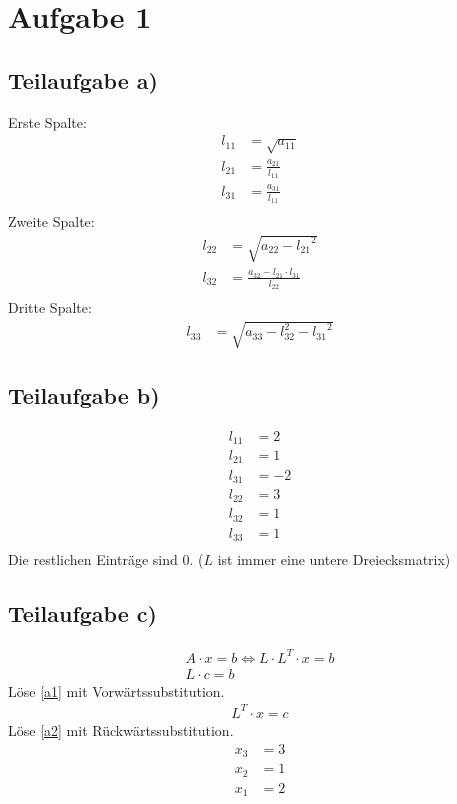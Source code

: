 \section*{Aufgabe 1}
\subsection*{Teilaufgabe a)}

Erste Spalte:
\begin{align}
	l_{11} &= \sqrt{a_{11}} \\
	l_{21} &= \frac{a_{21}}{l_{11}}\\
	l_{31} &= \frac{a_{31}}{l_{11}}\\
\end{align}
Zweite Spalte:
\begin{align}
	l_{22} &= \sqrt{a_{22} - {l_{21}}^2}\\
	l_{32} &= \frac{a_{32} -l_{21} \cdot l_{31}}{l_{22}} \\
\end{align}
Dritte Spalte:
\begin{align}
	l_{33} &= \sqrt{a_{33}-{l_{32}^2}-{l_{31}}^2}
\end{align}

\subsection*{Teilaufgabe b)}
\begin{align}
	l_{11} &= 2 \\
	l_{21} &= 1 \\
	l_{31} &= -2 \\
	l_{22} &= 3 \\
	l_{32} &= 1 \\
	l_{33} &= 1 \\
\end{align}
Die restlichen Einträge sind $0$. ($L$ ist immer eine untere Dreiecksmatrix)

\subsection*{Teilaufgabe c)}

\begin{align}
	A \cdot x = b \Leftrightarrow L \cdot L^T \cdot x = b \\
	L \cdot c = b \label{a1}
\end{align}
Löse \ref{a1} mit Vorwärtssubstitution.
\begin{align}
	L^T \cdot x = c \label{a2}
\end{align}
Löse \ref{a2} mit Rückwärtssubstitution.
\begin{align}
	x_3 &= 3 \\
	x_2 &= 1 \\
	x_1 &= 2
\end{align}
